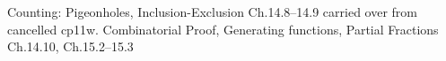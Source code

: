 \documentclass[handout]{mcs}
\begin{document}

\begin{staffnotes}
Counting: Pigeonholes, Inclusion-Exclusion Ch.14.8--14.9 carried over
from cancelled cp11w.  Combinatorial Proof, Generating functions,
Partial Fractions Ch.14.10, Ch.15.2--15.3
\end{staffnotes}









\end{document}
